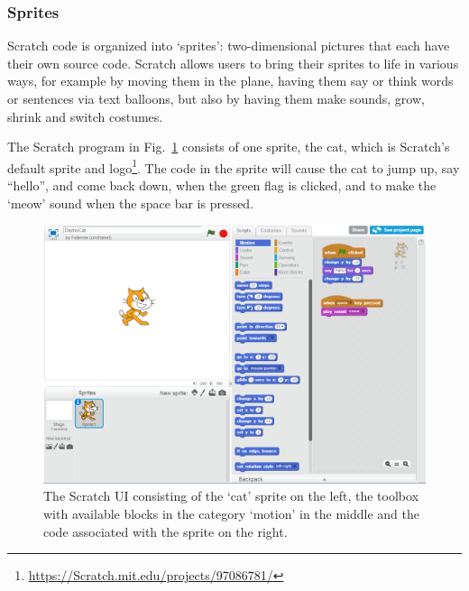 \documentclass[conference]{IEEEtran}
\begin{document}
\subsubsection{Sprites}
Scratch code is organized into `sprites': two-dimensional pictures that each have their own source code. Scratch allows users to bring their sprites to life in various ways, for example by moving them in the plane, having them say or think words or sentences via text balloons, but also by having them make sounds, grow, shrink and switch costumes. 

The Scratch program in Fig.~\ref{fig:ui} consists of one sprite, the cat, which is Scratch's default sprite and logo\footnote{\url{https://Scratch.mit.edu/projects/97086781/}}. The code in the sprite will cause the cat to jump up, say ``hello'', and come back down, when the green flag is clicked, and to make the `meow' sound when the space bar is pressed.

\begin{figure}[tb]
  \begin{center}
  \includegraphics[width=\columnwidth]{fig/ui.png}
  \caption{The Scratch UI consisting of the `cat' sprite on the left, the toolbox with available blocks in the category `motion' in the middle and the code associated with the sprite on the right.}
  \label{fig:ui}
  \end{center}
\end{figure} 

\end{document}
